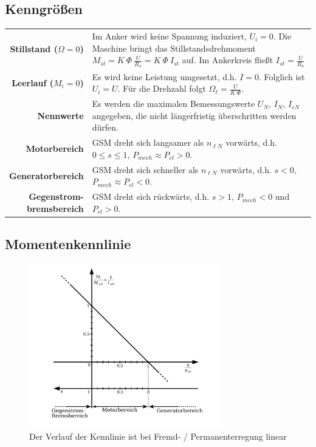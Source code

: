 \documentclass[11pt]{article}
\begin{document}
\subsection*{Kenngrößen}
\begin{center}
\bgroup
\begin{longtable}{r p{12cm}}
	\textbf{Stillstand ($\Omega = 0$)} & Im Anker wird keine Spannung induziert, $U_i = 0$. Die Maschine bringt das Stillstandsdrehmoment $M_{st} = K ~ \Phi ~ \frac{U}{R_a} = K ~ \Phi ~ I_{st}$ auf. Im Ankerkreis fließt $I_{st} = \frac{U}{R_a}$ \\
	\textbf{Leerlauf ($M_i = 0$)} & Es wird keine Leistung umgesetzt, d.h. $I = 0$. Folglich ist $U_i = U$. Für die Drehzahl folgt $\Omega_\ell = \frac{U}{K ~ \Phi}$. \\
	\textbf{Nennwerte} & Es werden die maximalen Bemessungswerte $U_N$, $I_N$, $I_{eN}$ angegeben, die nicht längerfristig überschritten werden dürfen. \\
	\textbf{Motorbereich} & GSM dreht sich langsamer als $n_{\ell N}$ vorwärts, d.h. $0 \leq s \leq 1$, $P_{mech} \approx P_{el} > 0$. \\
	\textbf{Generatorbereich} & GSM dreht sich schneller als $n_{\ell N}$ vorwärts, d.h. $s < 0$, $P_{mech} \approx P_{el} < 0$. \\
	\pbox{20cm}{\textbf{Gegenstrom-} \\ \textbf{bremsbereich}} & GSM dreht sich rückwärts, d.h. $s > 1$, $P_{mech} < 0$ und $P_{el} > 0$.
\end{longtable}
\egroup
\end{center}

\subsection*{Momentenkennlinie}
\begin{figure}[H]
	\centering
	\includegraphics[width=0.75\textwidth]{img/gleichstrommaschine_kennlinie.pdf}
	\caption*{Der Verlauf der Kennlinie ist bei Fremd- / Permanenterregung linear}
\end{figure}
\end{document}
